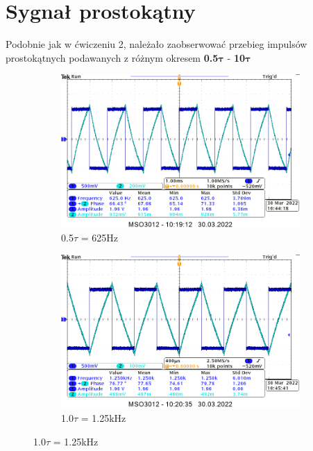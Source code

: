 \section{Sygnał prostokątny}

Podobnie jak w ćwiczeniu 2, należało zaobserwować przebieg impulsów prostokątnych podawanych z różnym okresem \langle\textbf{0.5}$\boldsymbol{\tau}$ - \textbf{10}$\boldsymbol{\tau}$\rangle

\label{poprawa:dodanie_wartosci_okresow_4_6}

\begin{figure}[H]
    \centering
    \begin{subfigure}[h]{0.45\textwidth}
        \includegraphics[width=\textwidth]{img_osciloscope/RC_pros/RC_prostokat_0_5_tau_cropped.png}
        \caption*{0.5$\tau$ = 625Hz}
    \end{subfigure}
    \begin{subfigure}[h]{0.45\textwidth}
        \includegraphics[width=\textwidth]{img_osciloscope/RC_pros/RC_prostokat_1_0_tau_cropped.png}
        \caption*{1.0$\tau$ = 1.25kHz}
    \end{subfigure}
\end{figure}

